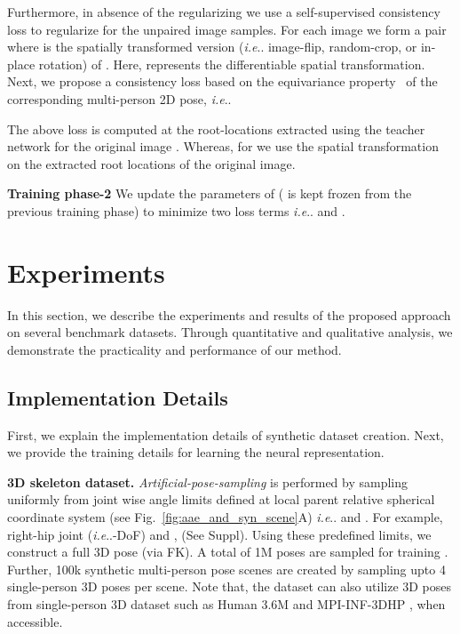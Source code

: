 \documentclass[runningheads]{llncs}
\makeatletter
\DeclareRobustCommand\onedot{\futurelet\@let@token\@onedot}
\def\@onedot{\ifx\@let@token.\else.\null\fi\xspace}
\def\ie{\emph{i.e}\onedot} \def\Ie{\emph{I.e}\onedot}
\makeatother
\begin{document}
Furthermore, in absence of the regularizing  we use a self-supervised consistency loss to regularize  for the unpaired image samples. For each image  we form a pair  where  is the spatially transformed version (\ie image-flip, random-crop, or in-place rotation) of . Here,  represents the differentiable spatial transformation. Next, we propose a consistency loss based on the equivariance property~\cite{schmidt2012learning} of the corresponding multi-person 2D pose, \ie

The above loss is computed at the root-locations extracted using the teacher network for the original image . Whereas, for  we use the spatial transformation  on the extracted root locations of the original image.  

\noindent
\textbf{Training phase-2} We update the parameters of  ( is kept frozen from the previous training phase) to minimize two loss terms \ie  and . 

\section{Experiments}
In this section, we describe the experiments and results of the proposed approach on several benchmark datasets. Through quantitative and qualitative analysis, we demonstrate the practicality and performance of our method.

\subsection{Implementation Details}
First, we explain the implementation details of synthetic dataset creation. Next, we provide the training details for learning the neural representation. 

\textbf{3D skeleton dataset.} \textit{Artificial-pose-sampling} is performed by sampling uniformly from joint wise angle limits defined at local parent relative \cite{akhter2015pose} spherical coordinate system (see Fig.~\ref{fig:aae_and_syn_scene}{\color{red}A}) \ie  and  . For example, right-hip joint  (\ie 1-DoF) and ,  (See Suppl). Using these predefined limits, we construct a full 3D pose (via FK). A total of 1M poses are sampled for training  . Further, 100k synthetic multi-person pose scenes are created by sampling upto 4 single-person 3D poses per scene. Note that, the  dataset can also utilize 3D poses from single-person 3D dataset such as Human 3.6M \cite{ionescu2013human3} and MPI-INF-3DHP \cite{mehta2017monocular}, when accessible.
\end{document}
